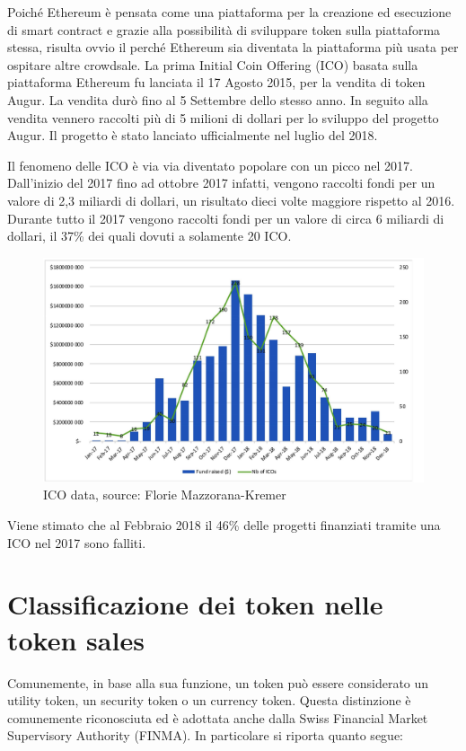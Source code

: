 Poiché Ethereum è pensata come una piattaforma per la creazione ed esecuzione di smart contract e grazie alla possibilità di sviluppare token sulla piattaforma stessa, risulta ovvio il perché Ethereum sia diventata la piattaforma più usata per ospitare altre crowdsale. La prima Initial Coin Offering (ICO) basata sulla piattaforma Ethereum fu lanciata il 17 Agosto 2015, per la vendita di token Augur\cite{K29}. La vendita durò fino al 5 Settembre dello stesso anno. In seguito alla vendita vennero raccolti più di 5 milioni di dollari per lo sviluppo del progetto Augur. Il progetto è stato lanciato ufficialmente nel luglio del 2018. 

Il fenomeno delle ICO è via via diventato popolare con un picco nel 2017. Dall'inizio  del 2017 fino ad ottobre 2017 infatti, vengono raccolti fondi per un valore di 2,3 miliardi di dollari, un risultato dieci volte maggiore rispetto al 2016. 
Durante tutto il 2017 vengono raccolti fondi per un valore di circa 6 miliardi di dollari, il 37\% dei quali dovuti a solamente 20 ICO. 

\begin{figure}[H]
  \includegraphics[width=\linewidth]{ico.jpg}
  \caption{ICO data, source: Florie Mazzorana-Kremer\cite{K30}}
  \label{fig:ico}
\end{figure}

Viene stimato che al Febbraio 2018 il 46\% delle progetti finanziati tramite una ICO nel 2017 sono falliti. 

\section{Classificazione dei token nelle token sales}
Comunemente, in base alla sua funzione, un token può essere considerato un utility token, un security token o un currency token. Questa distinzione è comunemente riconosciuta ed è adottata anche dalla Swiss Financial Market Supervisory Authority (FINMA). In particolare si riporta quanto segue:

